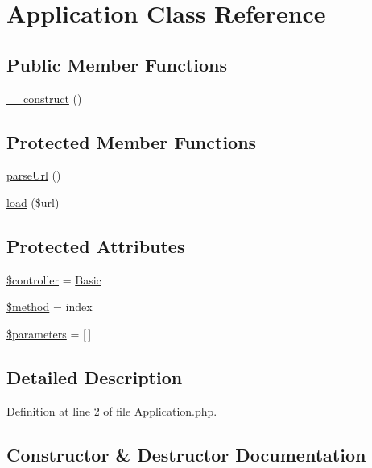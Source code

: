 \hypertarget{class_application}{}\section{Application Class Reference}
\label{class_application}
\subsection*{Public Member Functions}
\begin{DoxyCompactItemize}
\item 
\hyperlink{class_application_a095c5d389db211932136b53f25f39685}{\+\_\+\+\_\+construct} ()
\end{DoxyCompactItemize}
\subsection*{Protected Member Functions}
\begin{DoxyCompactItemize}
\item 
\hyperlink{class_application_a354b02f944f9accd1eefa779cfcc1cc8}{parse\+Url} ()
\item 
\hyperlink{class_application_ae3eeda1d8c99497a02792cc1a66c7d15}{load} (\$url)
\end{DoxyCompactItemize}
\subsection*{Protected Attributes}
\begin{DoxyCompactItemize}
\item 
\hyperlink{class_application_a0eb1786d89f8acef683a1fbeeeb87518}{\$controller} = \textquotesingle{}\hyperlink{class_basic}{Basic}\textquotesingle{}
\item 
\hyperlink{class_application_a12661b2fc0f57f97e30a1620889ce9c6}{\$method} = \textquotesingle{}index\textquotesingle{}
\item 
\hyperlink{class_application_ab79d246480c4ac3a0db6bbceca92ad32}{\$parameters} = \mbox{[}$\,$\mbox{]}
\end{DoxyCompactItemize}


\subsection{Detailed Description}


Definition at line 2 of file Application.\+php.



\subsection{Constructor \& Destructor Documentation}
\hypertarget{class_application_a095c5d389db211932136b53f25f39685}{}\label{class_application_a095c5d389db211932136b53f25f39685} 
